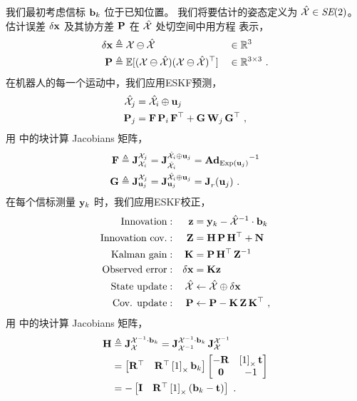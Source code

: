 我们最初考虑信标 ${\bf b}_k$ 位于已知位置。 
我们将要估计的姿态定义为 $\hat{\mathcal{X}}\in\textit{SE}(2)$。
估计误差 ${\delta{\bf x}}$ 及其协方差 ${\bf P}$ 在 $\hat{\mathcal{X}}$ 处切空间中用方程  表示，
%
\begin{align}\label{equ:loc_Gaussian}
{\delta{\bf x}} &\triangleq \mathcal{X}\ominus\hat{\mathcal{X}} && \in{\mathbb R}^3
\\
{\bf P} &\triangleq {\mathbb E}[(\mathcal{X}\ominus\hat{\mathcal{X}})(\mathcal{X}\ominus\hat{\mathcal{X}})^{\top}]&& \in{\mathbb R}^{3\times3}
~.
\end{align}
%
在机器人的每一个运动中，我们应用ESKF预测，
%
\begin{align}
\hat{\mathcal{X}}_j &= \hat{\mathcal{X}}_i\oplus{\bf u}_j \label{equ:loc_ekf_pred}
\\
{\bf P}_j &= {\bf F}\,{\bf P}_i\,{\bf F}^{\top} + {\bf G}\,{\bf W}_j\,{\bf G}^{\top}
~,
\end{align}
%
用  中的块计算 Jacobians 矩阵，
%
\begin{align*}
{\bf F} &\triangleq {{\bf J}^{\mathcal{X}_j}_{\mathcal{X}_i}} = {{\bf J}^{\hat{\mathcal{X}}_i\oplus{\bf u}_j}_{\hat{\mathcal{X}}_i}} 
= {\mathbf{Ad}_{\operatorname*{Exp}({\bf u}_j)}}^{-1}
\\
{\bf G} &\triangleq {{\bf J}^{\mathcal{X}_j}_{{\bf u}_j}} = {{\bf J}^{\hat{\mathcal{X}}_i\oplus{\bf u}_j}_{{\bf u}_j}} = {{\bf J}^{}_{r}}({\bf u}_j)
~.
\end{align*}
%
在每个信标测量 ${\bf y}_k$ 时，我们应用ESKF校正，
%
\begin{align}
\textrm{Innovation}&:&{\bf z} &= {\bf y}_k - \hat{\mathcal{X}}^{-1}\cdot{\bf b}_k \notag\\
\textrm{Innovation cov.}&:&{\bf Z} &= {\bf H}\,{\bf P}\,{\bf H}^{\top}+{\bf N} \notag\\
\textrm{Kalman gain}&:&{\bf K} &= {\bf P}\,{\bf H}^{\top}\,{\bf Z}^{-1} \notag\\
\textrm{Observed error}&:&{\delta{\bf x}} &= {\bf K}{\bf z} \notag\\
\textrm{State update}&:&\hat{\mathcal{X}} &\gets \hat{\mathcal{X}} \oplus {\delta{\bf x}} \label{equ:loc_ekf_corr}\\
\textrm{Cov. update}&:&{\bf P} &\gets {\bf P} - {\bf K}\,{\bf Z}\,{\bf K}^{\top}
~,
\end{align}
%
用  中的块计算 Jacobians 矩阵，
\begin{align*}
{\bf H} 
&\triangleq {{\bf J}^{\mathcal{X}^{-1}\cdot{\bf b}_k}_{\mathcal{X}}}= {{\bf J}^{\mathcal{X}^{-1}\cdot{\bf b}_k}_{\mathcal{X}^{-1}}}\,{{\bf J}^{\mathcal{X}^{-1}}_{\mathcal{X}}} 
\notag\\
&= 
\begin{bmatrix}{\bf R}^{\top} & {\bf R}^{\top}\left[1\right]_\times{\bf b}_k\end{bmatrix}
\begin{bmatrix}
-{\bf R} & \left[1\right]_\times{\bf t} \\ \bf0 & -1
\end{bmatrix}
\notag\\
&=
-\begin{bmatrix}{\bf I} & {\bf R}^{\top}\left[1\right]_\times({\bf b}_k-{\bf t})\end{bmatrix}
~.
\end{align*}


